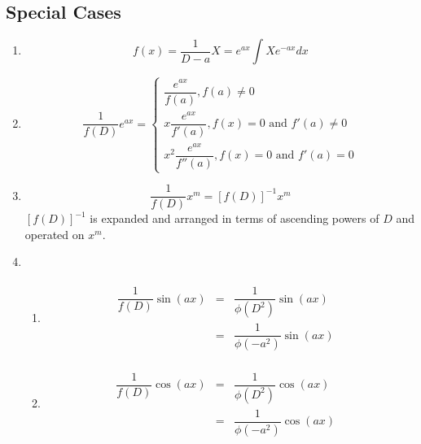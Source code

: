 \documentclass[openany, oneside]{book}
\begin{document}
\subsection{Special Cases}
\begin{enumerate}
\item \begin{equation}f(x)=\dfrac{1}{D-a}X=e^{ax}\int Xe^{-ax}dx \end{equation}

\item \begin{equation}\dfrac{1}{f(D)}e^{ax}=\begin{cases}
\dfrac{e^{ax}}{f(a)}, f(a)\neq 0\\
x\dfrac{e^{ax}}{f'(a)}, f(x)=0 \text{ and } f'(a)\neq 0\\
x^2\dfrac{e^{ax}}{f''(a)}, f(x)=0 \text{ and } f'(a)= 0
\end{cases}
\end{equation}

\item \begin{equation} \dfrac{1}{f(D)}x^m=[f(D)]^{-1} x^m \end{equation}
$[f(D)]^{-1}$ is expanded and arranged in terms of ascending powers of $D$ and operated on $x^m$.

\item \begin{enumerate}
\item \begin{equation}\begin{aligned}\begin{split} \dfrac{1}{f(D)} \sin (ax) &=& \dfrac{1}{\phi(D^2)} \sin (ax)&\\ &=&\dfrac{1}{\phi(-a^2)} \sin (ax) \end{split}\end{aligned}\end{equation}

\item \begin{equation}\begin{aligned}\begin{split} \dfrac{1}{f(D)} \cos (ax) &=& \dfrac{1}{\phi(D^2)} \cos (ax)&\\ &=&\dfrac{1}{\phi(-a^2)} \cos (ax) \end{split}\end{aligned}\end{equation}
\end{enumerate}


\end{enumerate}
\end{document}

